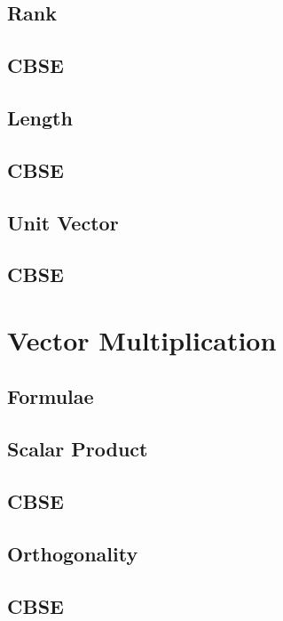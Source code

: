 \documentclass[journal]{IEEEtran}
\begin{document}
\subsection{Rank}

\subsection{CBSE}

\subsection{Length}

\subsection{CBSE}

\subsection{Unit Vector}

\subsection{CBSE}

%
%
\newpage
\section{Vector Multiplication}
\subsection{Formulae}

\subsection{Scalar Product}

\subsection{CBSE}

\subsection{Orthogonality}

\subsection{CBSE}

\end{document}
